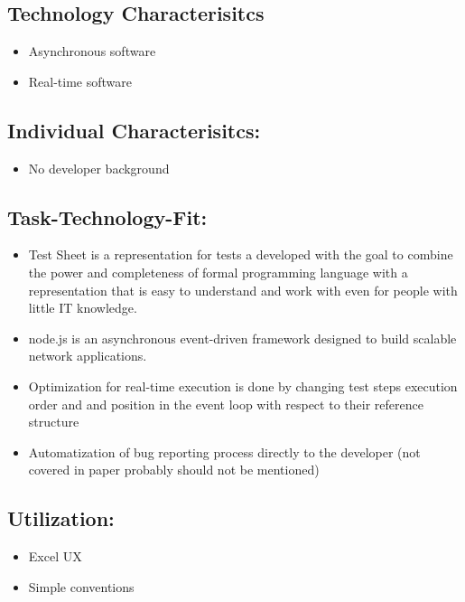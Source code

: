 \subsection{Technology Characterisitcs}
\begin{itemize}
	\item Asynchronous software
	\item	Real-time software
\end{itemize}

\subsection{Individual Characterisitcs:}
\begin{itemize}
	\item  No developer background
\end{itemize}

\subsection{Task-Technology-Fit:}
\begin{itemize}
	\item Test Sheet is a representation for tests a developed with the goal to combine the power and completeness of formal programming language with a representation that is easy to understand and work with even for people with little IT knowledge\cite{ts}.
	\item node.js is an asynchronous event-driven framework designed to build scalable network applications.
	\item Optimization for real-time execution is done by changing test steps execution order and and position in the event loop with respect to their reference structure
	\item Automatization of bug reporting process directly to the developer (not covered in paper probably should not be mentioned)
\end{itemize}

\subsection{Utilization:}
\begin{itemize}
	\item Excel UX
	\item Simple conventions
\end{itemize}

